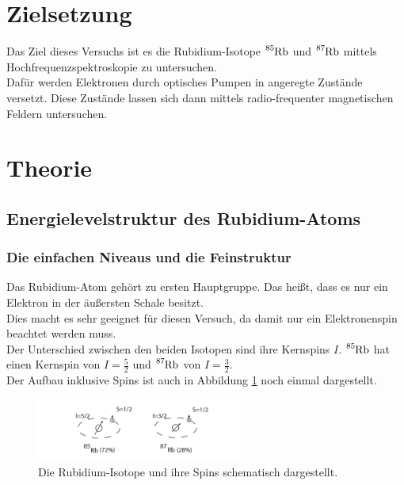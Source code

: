 \section{Zielsetzung}
    Das Ziel dieses Versuchs ist es die Rubidium-Isotope $\ce{^{85}Rb}$ und $\ce{^{87}Rb}$ mittels Hochfrequenzspektroskopie zu untersuchen.\\
    Dafür werden Elektronen durch optisches Pumpen in angeregte Zustände versetzt. Diese Zustände lassen sich dann mittels radio-frequenter magnetischen Feldern untersuchen.
\section{Theorie}

\subsection{Energielevelstruktur des Rubidium-Atoms}


\subsubsection{Die einfachen Niveaus und die Feinstruktur}
\noindent
Das Rubidium-Atom gehört zu ersten Hauptgruppe. Das heißt, dass es nur ein Elektron in der äußersten Schale besitzt.\\
Dies macht es sehr geeignet für diesen Versuch, da damit nur ein Elektronenspin beachtet werden muss.\\
Der Unterschied zwischen den beiden Isotopen sind ihre Kernspins $I$. 
$\ce{^{85}Rb}$ hat einen Kernspin von $I = \frac{5}{2}$ und $\ce{^{87}Rb}$ von $I = \frac{3}{2}$.\\ 
Der Aufbau inklusive Spins ist auch in Abbildung \ref{img:Iso} noch einmal dargestellt.

\begin{figure}[H]
    \centering
    \includegraphics[width=0.6\textwidth]{latex/images/Isotopes.PNG}
    \caption{Die Rubidium-Isotope und ihre Spins schematisch dargestellt\protect \cite{pump_1}.}
    \label{img:Iso}
\end{figure}

